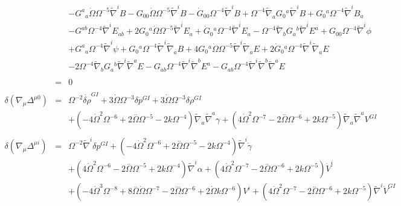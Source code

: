 \documentclass[10pt,letterpaper]{article}
\numberwithin{equation}{section}
\begin{document}
\begin{eqnarray}
&& -  G^{a}{}_{a} \dot{\Omega} \Omega^{-5} \tilde{\nabla}^{i}B -  G_{00}{} \dot{\Omega} \Omega^{-5} \tilde{\nabla}^{i}B -  \dot{G}_{00}{} \Omega^{-4} \tilde{\nabla}^{i}B + \Omega^{-4} \tilde{\nabla}_{a}G_{0}{}^{a} \tilde{\nabla}^{i}B + G_{0}{}^{a} \Omega^{-4} \tilde{\nabla}^{i}B_{a} \nonumber \\ 
&& -  G^{ab} \Omega^{-4} \tilde{\nabla}^{i}E_{ab} + 2 G_{0}{}^{a} \dot{\Omega} \Omega^{-5} \tilde{\nabla}^{i}E_{a} + \dot{G}_{0}{}^{a} \Omega^{-4} \tilde{\nabla}^{i}E_{a} -  \Omega^{-4} \tilde{\nabla}_{b}G_{a}{}^{b} \tilde{\nabla}^{i}E^{a} + G_{00}{} \Omega^{-4} \tilde{\nabla}^{i}\phi \nonumber \\ 
&& + G^{a}{}_{a} \Omega^{-4} \tilde{\nabla}^{i}\psi + G_{0}{}^{a} \Omega^{-4} \tilde{\nabla}^{i}\tilde{\nabla}_{a}B + 4 G_{0}{}^{a} \dot{\Omega} \Omega^{-5} \tilde{\nabla}^{i}\tilde{\nabla}_{a}E + 2 \dot{G}_{0}{}^{a} \Omega^{-4} \tilde{\nabla}^{i}\tilde{\nabla}_{a}E \nonumber \\ 
&& - 2 \Omega^{-4} \tilde{\nabla}_{b}G_{a}{}^{b} \tilde{\nabla}^{i}\tilde{\nabla}^{a}E -  G_{ab} \Omega^{-4} \tilde{\nabla}^{i}\tilde{\nabla}^{b}E^{a} -  G_{ab} \Omega^{-4} \tilde{\nabla}^{i}\tilde{\nabla}^{b}\tilde{\nabla}^{a}E
\\  \nonumber\\ 
&=&0
\\ \nonumber\\
\delta(\nabla_\mu \Delta^{\mu 0})&=& \Omega^{-2} \dot{\delta \rho}^{GI}{} + 3 \dot{\Omega} \Omega^{-3} \delta p^{GI}{} + 3 \dot{\Omega} \Omega^{-3} \delta \rho^{GI}{} \nonumber \\ 
&& + (-4 \dot{\Omega}^2 \Omega^{-6} + 2 \overset{..}{\Omega} \Omega^{-5} - 2 k \Omega^{-4}) \tilde{\nabla}_{a}\tilde{\nabla}^{a}\gamma +(4 \dot{\Omega}^2 \Omega^{-7} - 2 \overset{..}{\Omega} \Omega^{-6} + 2 k \Omega^{-5}) \tilde{\nabla}_{a}\tilde{\nabla}^{a}V^{GI}{}
\\  \nonumber\\ 
\delta(\nabla_\mu \Delta^{\mu i})&=& \Omega^{-2} \tilde{\nabla}^{i}\delta p^{GI}{} + (-4 \dot{\Omega}^2 \Omega^{-6} + 2 \overset{..}{\Omega} \Omega^{-5} - 2 k \Omega^{-4}) \tilde{\nabla}^{i}\dot{\gamma} \nonumber \\ 
&& + (4 \dot{\Omega}^2 \Omega^{-6} - 2 \overset{..}{\Omega} \Omega^{-5} + 2 k \Omega^{-4}) \tilde{\nabla}^{i}\alpha +(4 \dot{\Omega}^2 \Omega^{-7} - 2 \overset{..}{\Omega} \Omega^{-6} + 2 k \Omega^{-5}) \dot{V}^{i} \nonumber \\ 
&& + (-4 \dot{\Omega}^3 \Omega^{-8} + 8 \overset{..}{\Omega} \dot{\Omega} \Omega^{-7} - 2 \overset{...}{\Omega} \Omega^{-6} + 2 \dot{\Omega} k \Omega^{-6}) V^{i} + (4 \dot{\Omega}^2 \Omega^{-7} - 2 \overset{..}{\Omega} \Omega^{-6} + 2 k \Omega^{-5}) \tilde{\nabla}^{i}\dot{V}^{GI}{} \nonumber \\ 

\end{eqnarray}
\end{document}
